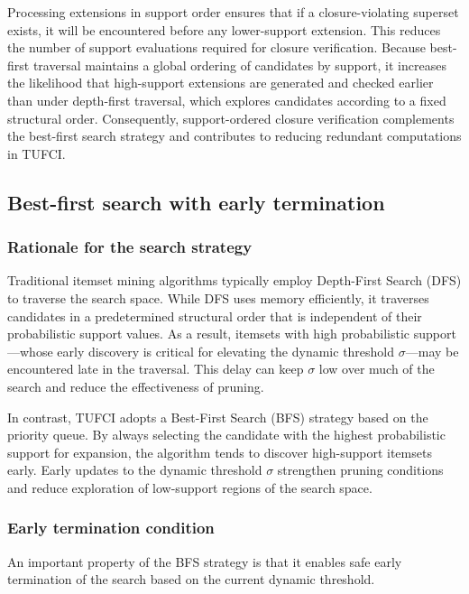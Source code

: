 \documentclass[10pt,letterpaper]{article}
\begin{document}
Processing extensions in support order ensures that if a closure-violating superset exists, it will be encountered before any lower-support extension. This reduces the number of support evaluations required for closure verification. Because best-first traversal maintains a global ordering of candidates by support, it increases the likelihood that high-support extensions are generated and checked earlier than under depth-first traversal, which explores candidates according to a fixed structural order. Consequently, support-ordered closure verification complements the best-first search strategy and contributes to reducing redundant computations in TUFCI.
\subsection*{Best-first search with early termination}

\subsubsection*{Rationale for the search strategy}

Traditional itemset mining algorithms typically employ Depth-First Search (DFS) to traverse the search space. While DFS uses memory efficiently, it traverses candidates in a predetermined structural order that is independent of their probabilistic support values. As a result, itemsets with high probabilistic support—whose early discovery is critical for elevating the dynamic threshold \(\sigma\)—may be encountered late in the traversal. This delay can keep \(\sigma\) low over much of the search and reduce the effectiveness of pruning.

In contrast, TUFCI adopts a Best-First Search (BFS) strategy based on the priority queue. By always selecting the candidate with the highest probabilistic support for expansion, the algorithm tends to discover high-support itemsets early. Early updates to the dynamic threshold \(\sigma\) strengthen pruning conditions and reduce exploration of low-support regions of the search space.

\subsubsection*{Early termination condition}

An important property of the BFS strategy is that it enables safe early termination of the search based on the current dynamic threshold.
\end{document}
